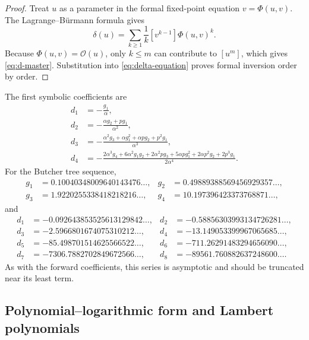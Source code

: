 \documentclass[11pt]{article}
\theoremstyle{definition}
\theoremstyle{remark}
\newcommand{\BigO}{\mathcal O}
\begin{document}
\begin{proof}
Treat $u$ as a parameter in the formal fixed-point equation
$v=\Phi(u,v)$.  The Lagrange--B\"urmann formula gives
\[
 \delta(u)=\sum_{k\geq1}\frac1k[v^{k-1}]\Phi(u,v)^k.
\]
Because $\Phi(u,v)=\BigO(u)$, only $k\leq m$ can contribute to $[u^m]$,
which gives \cref{eq:d-master}.  Substitution into
\cref{eq:delta-equation} proves formal inversion order by order.
\end{proof}

The first symbolic coefficients are
\begin{align}
 d_1&=-\frac{g_1}{\alpha},
 \label{eq:d1}\\
 d_2&=-\frac{\alpha g_2+pg_1}{\alpha^2},
 \label{eq:d2}\\
 d_3&=-\frac{\alpha^2g_3+\alpha g_1^2+\alpha pg_2+p^2g_1}
 {\alpha^3},
 \label{eq:d3}\\
 d_4&=-\frac{2\alpha^3g_4+6\alpha^2g_1g_2
 +2\alpha^2pg_3+5\alpha p g_1^2+2\alpha p^2g_2+2p^3g_1}
 {2\alpha^4}.
 \label{eq:d4}
\end{align}
For the Butcher tree sequence,
\begin{align*}
 g_1&=0.10040348009640143476\ldots,&
 g_2&=0.49889388569456929357\ldots,\\
 g_3&=1.9220255338418218216\ldots,&
 g_4&=10.197396423373768871\ldots,
\end{align*}
and
\begin{align*}
 d_1&=-0.092643853525613129842\ldots,&
 d_2&=-0.58856303993134726281\ldots,\\
 d_3&=-2.5966801674075310212\ldots,&
 d_4&=-13.149053399967065685\ldots,\\
 d_5&=-85.498701514625566522\ldots,&
 d_6&=-711.26291483294656090\ldots,\\
 d_7&=-7306.7882702849672566\ldots,&
 d_8&=-89561.760882637248600\ldots.
\end{align*}
As with the forward coefficients, this series is asymptotic and should be
truncated near its least term.

\subsection{Polynomial--logarithmic form and Lambert polynomials}
\label{subsec:polylog-inverse}
\end{document}
